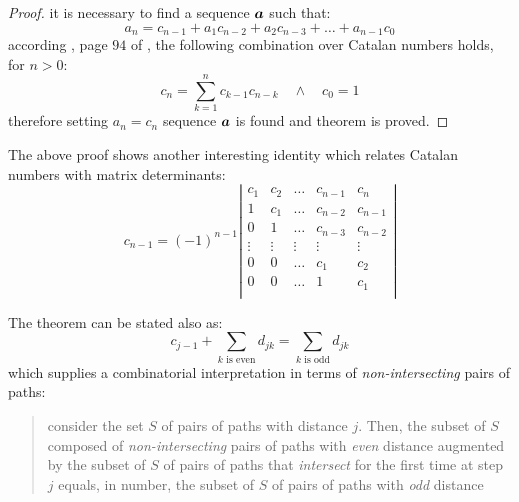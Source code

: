 \begin{proof}
    it is necessary to find a sequence $\boldsymbol{a}$ such that:
    \begin{displaymath}                
        a_{n} = c_{n-1}+a_{1}c_{n-2}+a_{2}c_{n-3}+\ldots+a_{n-1}c_{0}
    \end{displaymath}                
    according \citeauthor{feller:intro:combinatorial:analysis}, page $94$ of
    \cite{feller:intro:combinatorial:analysis}, the following combination over
    Catalan numbers holds, for $n>0$:
    \begin{displaymath}                
        c_{n}=\sum_{k=1}^{n}{c_{k-1}c_{n-k}}\quad\wedge\quad c_{0}=1
    \end{displaymath}                
    therefore setting $a_{n}=c_{n}$ sequence $\boldsymbol{a}$ is found and theorem
    is proved.

\end{proof}

The above proof shows another interesting identity which relates Catalan numbers
with matrix determinants:
\begin{displaymath}                
    c_{n-1} = (-1)^{n-1}
        \left|
        \begin{array}{ccccc}
            c_1 & c_2 & \ldots & c_{n-1} & c_{n}\\
            1 & c_1 & \ldots & c_{n-2} & c_{n-1}\\
            0   & 1 & \ldots & c_{n-3} & c_{n-2}\\
            \vdots & \vdots & \vdots & \vdots & \vdots\\
            0 & 0 & \ldots & c_{1} & c_{2}\\
            0 & 0 & \ldots & 1 & c_{1}\\
        \end{array}
        \right|
\end{displaymath}                

The theorem can be stated also as:
\begin{displaymath}                
    c_{j-1} + \sum_{{k \text{ is even}}}{d_{jk}}
        = \sum_{{k \text{ is odd}}}{d_{jk}}
\end{displaymath}
which supplies a combinatorial interpretation in terms of 
\emph{non-intersecting} pairs of paths:
\begin{quote}
    consider the set $S$ of pairs of paths with distance $j$. Then,
    the subset of $S$ composed of \emph{non-intersecting} pairs of paths 
    with \emph{even} distance augmented by the subset of $S$ of 
    pairs of paths that \emph{intersect} for the first time at step $j$
    equals, in number, the subset of $S$ of pairs of paths with \emph{odd}
    distance
\end{quote}



















